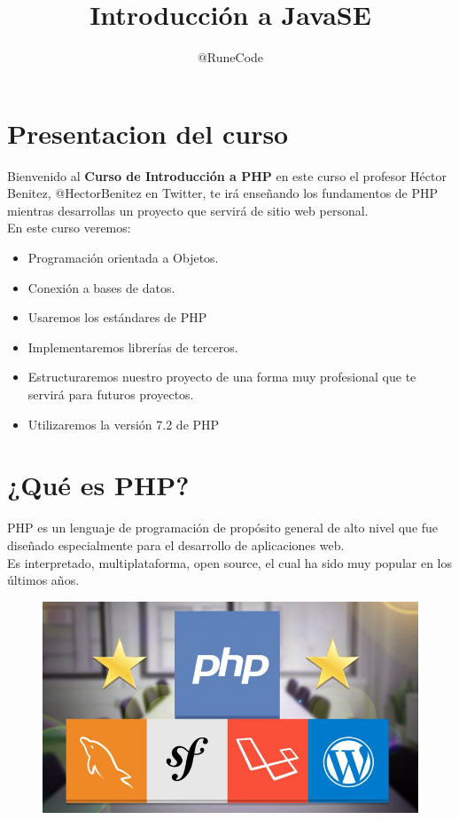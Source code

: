 \documentclass{article}
\title{Introducción a JavaSE}
\author{@RuneCode}
\begin{document}

\section{Presentacion del curso}%
Bienvenido al \textbf{Curso de Introducción a PHP} en este curso el profesor
Héctor Benitez, @HectorBenitez en Twitter, te irá enseñando los fundamentos de
PHP mientras desarrollas un proyecto que servirá de sitio web personal.\\

En este curso veremos:
\begin{itemize}
  \item Programación orientada a Objetos.
  \item Conexión a bases de datos.
  \item Usaremos los estándares de PHP
  \item Implementaremos librerías de terceros.
  \item Estructuraremos nuestro proyecto de una forma muy profesional que te
    servirá para futuros proyectos.
  \item Utilizaremos la versión 7.2 de PHP
\end{itemize}

\section{¿Qué es PHP?}%
PHP es un lenguaje de programación de propósito general de alto nivel que fue
diseñado especialmente para el desarrollo de aplicaciones web.\\

Es interpretado, multiplataforma, open source, el cual ha sido muy popular en
los últimos años.\\

\begin{figure}[h!]
  \centering
  \includegraphics[scale=0.5]{./Pictures/001_php_laravel_sf_wp.jpg}
\end{figure}
\end{document}
